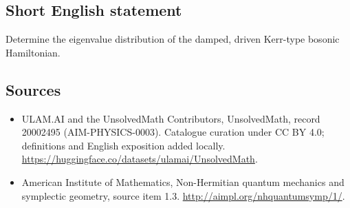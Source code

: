\documentclass[11pt]{article}
\begin{document}
\subsection{Short English statement}
Determine the eigenvalue distribution of the damped, driven Kerr-type bosonic Hamiltonian.
\subsection{Sources}
\begin{itemize}
\item[\hypertarget{source:20002495:1}{S1}] ULAM.AI and the UnsolvedMath Contributors, UnsolvedMath, record 20002495 (AIM-PHYSICS-0003). Catalogue curation under CC BY 4.0; definitions and English exposition added locally.
\url{https://huggingface.co/datasets/ulamai/UnsolvedMath}.
\item[\hypertarget{source:20002495:2}{S2}] American Institute of Mathematics, Non-Hermitian quantum mechanics and symplectic geometry, source item 1.3.
\url{http://aimpl.org/nhquantumsymp/1/}.
\end{itemize}
\label{end:20002495}
\end{document}
